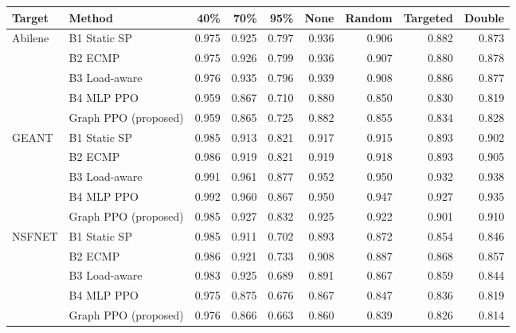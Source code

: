 \begin{tabular}{llrrrrrrr}
\toprule
Target & Method & 40\% & 70\% & 95\% & None & Random & Targeted & Double \\
\midrule
Abilene & B1 Static SP & 0.975 & 0.925 & 0.797 & 0.936 & 0.906 & 0.882 & 0.873 \\
 & B2 ECMP & 0.975 & 0.926 & 0.799 & 0.936 & 0.907 & 0.880 & 0.878 \\
 & B3 Load-aware & 0.976 & 0.935 & 0.796 & 0.939 & 0.908 & 0.886 & 0.877 \\
 & B4 MLP PPO & 0.959 & 0.867 & 0.710 & 0.880 & 0.850 & 0.830 & 0.819 \\
 & Graph PPO (proposed) & 0.959 & 0.865 & 0.725 & 0.882 & 0.855 & 0.834 & 0.828 \\
\midrule
GEANT & B1 Static SP & 0.985 & 0.913 & 0.821 & 0.917 & 0.915 & 0.893 & 0.902 \\
 & B2 ECMP & 0.986 & 0.919 & 0.821 & 0.919 & 0.918 & 0.893 & 0.905 \\
 & B3 Load-aware & 0.991 & 0.961 & 0.877 & 0.952 & 0.950 & 0.932 & 0.938 \\
 & B4 MLP PPO & 0.992 & 0.960 & 0.867 & 0.950 & 0.947 & 0.927 & 0.935 \\
 & Graph PPO (proposed) & 0.985 & 0.927 & 0.832 & 0.925 & 0.922 & 0.901 & 0.910 \\
\midrule
NSFNET & B1 Static SP & 0.985 & 0.911 & 0.702 & 0.893 & 0.872 & 0.854 & 0.846 \\
 & B2 ECMP & 0.986 & 0.921 & 0.733 & 0.908 & 0.887 & 0.868 & 0.857 \\
 & B3 Load-aware & 0.983 & 0.925 & 0.689 & 0.891 & 0.867 & 0.859 & 0.844 \\
 & B4 MLP PPO & 0.975 & 0.875 & 0.676 & 0.867 & 0.847 & 0.836 & 0.819 \\
 & Graph PPO (proposed) & 0.976 & 0.866 & 0.663 & 0.860 & 0.839 & 0.826 & 0.814 \\
\bottomrule
\end{tabular}